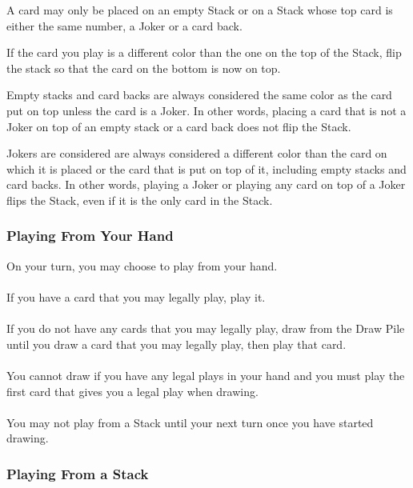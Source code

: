 \documentclass{article}
\begin{document}
A card may only be placed on an empty Stack or on a Stack whose top card is either the same number, a Joker or a card back.

If the card you play is a different color than the one on the top of the Stack, flip the stack so that the card on the bottom is now on top.

Empty stacks and card backs are always considered the same color as the card put on top unless the card is a Joker.
In other words, placing a card that is not a Joker on top of an empty stack or a card back does not flip the Stack.

Jokers are considered are always considered a different color than the card on which it is placed or the card that is put on top of it, including empty stacks and card backs.
In other words, playing a Joker or playing any card on top of a Joker flips the Stack, even if it is the only card in the Stack.

\subsubsection{Playing From Your Hand}
\label{sec:fromhand}

On your turn, you may choose to play from your hand.

\paragraph{}
If you have a card that you may legally play, play it.

\paragraph{}
If you do not have any cards that you may legally play, draw from the Draw Pile until you draw a card that you may legally play, then play that card.

\paragraph{}
You cannot draw if you have any legal plays in your hand and you must play the first card that gives you a legal play when drawing.

\paragraph{}
You may not play from a Stack until your next turn once you have started drawing.

\subsubsection{Playing From a Stack}
\label{sec:fromstack}
\end{document}
